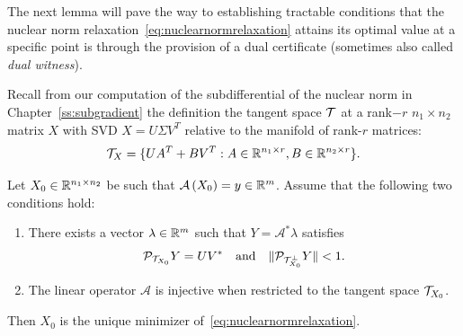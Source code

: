 The next lemma will pave the way to establishing tractable conditions that the nuclear norm relaxation~\eqref{eq:nuclearnormrelaxation}  attains its optimal value at a specific point is through the provision of a dual certificate (sometimes also called {\em dual witness}).

Recall from our computation of the subdifferential of the nuclear norm in Chapter~\ref{ss:subgradient} the definition the tangent space $\mathcal{T}$ at a rank$-r$ $n_1 \times n_2$ matrix $X$ with SVD $X = U \Sigma V^T$ relative to the manifold of rank-$r$ matrices:
$$\mathcal{T}_X = \{ U A^T + B V^T : A \in \mathbb{R}^{n_1 \times r}, B \in \mathbb{R}^{n_2 \times r} \}.$$





\begin{lemma}\label{le:candesrechtlowrank}
Let $X_0 \in \mathbb{R}^{n_1 \times n_2}$ be such that $\mathcal{A}\left( X_0 \right) = y \in \mathbb{R}^m$.
Assume that the following two conditions hold:
\begin{enumerate}
 \item There exists a vector $\lambda \in \mathbb{R}^m$ such that $Y=\mathcal{A}^* \lambda$ satisfies
\begin{equation}\label{eq:nucleardualcond}
 \mathcal{P}_{\mathcal{T}_{X_0}}  Y = UV^* \quad \text{and} \quad \Vert \mathcal{P}_{\mathcal{T}^{\perp}_{X_0}} Y  \Vert < 1.
\end{equation}
\item The linear operator $ \mathcal{A}$ is injective when restricted to the tangent space $\mathcal{T}_{X_0}$.
\end{enumerate}
Then $X_0$ is the unique minimizer of~\eqref{eq:nuclearnormrelaxation}.
\end{lemma}


